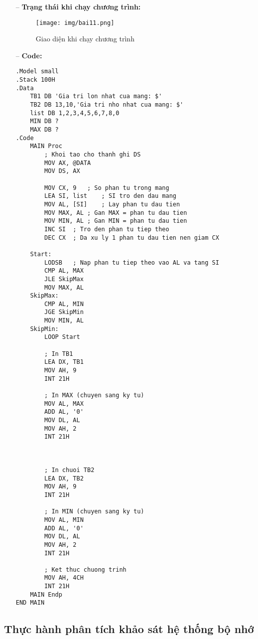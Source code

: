 \documentclass{article}
\begin{document}
\begin{itemize}
\item[--]\textbf{Trạng thái khi chạy chương trình:}

\begin{figure}[H]
    \centering
    \texttt{[image: img/bai11.png]}
    \caption{Giao diện khi chạy chương trình}
    \label{fig:before_input}
\end{figure}

\item[--]\textbf{Code:}
\begin{lstlisting}[caption={Tìm giá trị lớn nhất và nhỏ nhất của một mảng số}]
.Model small
.Stack 100H
.Data
    TB1 DB 'Gia tri lon nhat cua mang: $'
    TB2 DB 13,10,'Gia tri nho nhat cua mang: $'                
    list DB 1,2,3,4,5,6,7,8,0
    MIN DB ?
    MAX DB ?   
.Code
    MAIN Proc
        ; Khoi tao cho thanh ghi DS
        MOV AX, @DATA
        MOV DS, AX
                   
        MOV CX, 9   ; So phan tu trong mang
        LEA SI, list    ; SI tro den dau mang
        MOV AL, [SI]    ; Lay phan tu dau tien
        MOV MAX, AL ; Gan MAX = phan tu dau tien
        MOV MIN, AL ; Gan MIN = phan tu dau tien
        INC SI  ; Tro den phan tu tiep theo
        DEC CX  ; Da xu ly 1 phan tu dau tien nen giam CX
    
    Start:
        LODSB   ; Nap phan tu tiep theo vao AL va tang SI
        CMP AL, MAX
        JLE SkipMax
        MOV MAX, AL
    SkipMax:
        CMP AL, MIN
        JGE SkipMin
        MOV MIN, AL
    SkipMin:
        LOOP Start
    
        ; In TB1
        LEA DX, TB1
        MOV AH, 9
        INT 21H
    
        ; In MAX (chuyen sang ky tu)
        MOV AL, MAX
        ADD AL, '0'
        MOV DL, AL
        MOV AH, 2
        INT 21H


    
        ; In chuoi TB2
        LEA DX, TB2
        MOV AH, 9
        INT 21H
    
        ; In MIN (chuyen sang ky tu)
        MOV AL, MIN
        ADD AL, '0'
        MOV DL, AL
        MOV AH, 2
        INT 21H
    
        ; Ket thuc chuong trinh
        MOV AH, 4CH
        INT 21H
    MAIN Endp
END MAIN
\end{lstlisting}
\end{itemize}

\subsection{Thực hành phân tích khảo sát hệ thống bộ nhớ}
\end{document}
